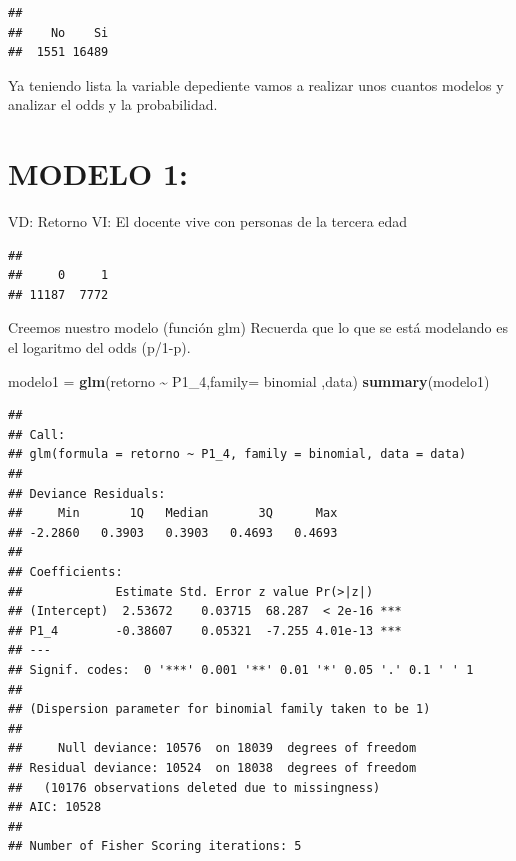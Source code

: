 \documentclass[
]{article}
\newenvironment{Shaded}{\begin{snugshade}}{\end{snugshade}}
\newcommand{\AttributeTok}[1]{\textcolor[rgb]{0.13,0.29,0.53}{#1}}
\newcommand{\CommentTok}[1]{\textcolor[rgb]{0.56,0.35,0.01}{\textit{#1}}}
\newcommand{\FunctionTok}[1]{\textcolor[rgb]{0.13,0.29,0.53}{\textbf{#1}}}
\newcommand{\NormalTok}[1]{#1}
\newcommand{\OtherTok}[1]{\textcolor[rgb]{0.56,0.35,0.01}{#1}}
\newcommand{\SpecialCharTok}[1]{\textcolor[rgb]{0.81,0.36,0.00}{\textbf{#1}}}
\newcommand{\StringTok}[1]{\textcolor[rgb]{0.31,0.60,0.02}{#1}}
\begin{document}
\begin{verbatim}
## 
##    No    Si 
##  1551 16489
\end{verbatim}

Ya teniendo lista la variable depediente vamos a realizar unos cuantos
modelos y analizar el odds y la probabilidad.

\hypertarget{modelo-1}{%
\section{MODELO 1:}\label{modelo-1}}

VD: Retorno VI: El docente vive con personas de la tercera edad

\begin{Shaded}
\end{Shaded}

\begin{verbatim}
## 
##     0     1 
## 11187  7772
\end{verbatim}

Creemos nuestro modelo (función glm) Recuerda que lo que se está
modelando es el logaritmo del odds (p/1-p).

\begin{Shaded}
\begin{Highlighting}[]
\NormalTok{modelo1 }\OtherTok{=} \FunctionTok{glm}\NormalTok{(retorno }\SpecialCharTok{\textasciitilde{}}\NormalTok{ P1\_4,}\AttributeTok{family=}\NormalTok{ binomial ,data)}
\FunctionTok{summary}\NormalTok{(modelo1)}
\end{Highlighting}
\end{Shaded}

\begin{verbatim}
## 
## Call:
## glm(formula = retorno ~ P1_4, family = binomial, data = data)
## 
## Deviance Residuals: 
##     Min       1Q   Median       3Q      Max  
## -2.2860   0.3903   0.3903   0.4693   0.4693  
## 
## Coefficients:
##             Estimate Std. Error z value Pr(>|z|)    
## (Intercept)  2.53672    0.03715  68.287  < 2e-16 ***
## P1_4        -0.38607    0.05321  -7.255 4.01e-13 ***
## ---
## Signif. codes:  0 '***' 0.001 '**' 0.01 '*' 0.05 '.' 0.1 ' ' 1
## 
## (Dispersion parameter for binomial family taken to be 1)
## 
##     Null deviance: 10576  on 18039  degrees of freedom
## Residual deviance: 10524  on 18038  degrees of freedom
##   (10176 observations deleted due to missingness)
## AIC: 10528
## 
## Number of Fisher Scoring iterations: 5
\end{verbatim}
\end{document}

